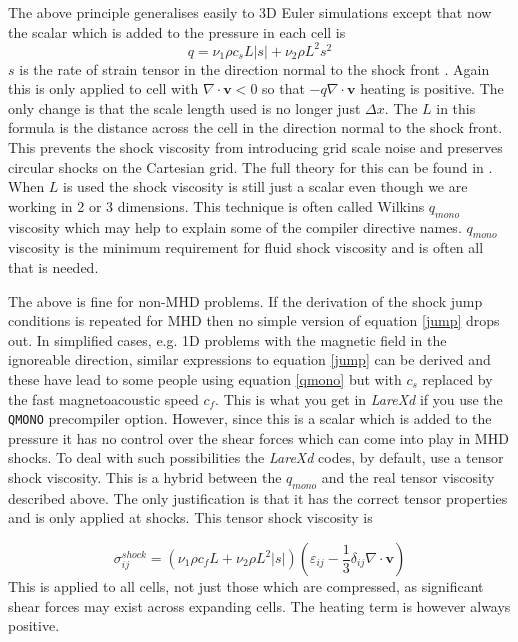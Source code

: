 \documentclass[11pt]{article}
\begin{document}
The above principle generalises easily to 3D Euler simulations except that now the scalar which is added to the pressure in each cell is
\begin{equation}
q = \nu_1 \rho c_s L|s| + \nu_2 \rho L^2 s^2 \label{qmono}
\end{equation}
$s$ is the rate of strain tensor in the direction normal to the shock front \cite{wilkins}. Again this is only applied to cell with $\nabla\cdot\mathbf{v}<0$ so that $-q \nabla\cdot\mathbf{v}$ heating is positive. The only change is that the scale length used is no longer just $\Delta x$. The $L$ in this formula is the distance across the cell in the direction normal to the shock front. This prevents the shock viscosity from introducing grid scale noise and preserves circular shocks on the Cartesian grid. The full theory for this can be found in \cite{wilkins}. When $L$ is used the shock viscosity is still just a scalar even though we are working in 2 or 3 dimensions. This technique is often called Wilkins $q_{mono}$ viscosity which may help to explain some of the compiler directive names. $q_{mono}$ viscosity is the minimum requirement for fluid shock viscosity and is often all that is needed.

The above is fine for non-MHD problems. If the derivation of the shock jump conditions is repeated for MHD then no simple version of equation \ref{jump} drops out. In simplified cases, e.g. 1D problems with the magnetic field in the ignoreable direction, similar expressions to equation \ref{jump} can be derived and these have lead to some people using  equation \ref{qmono} but with $c_s$ replaced by the fast magnetoacoustic speed $c_f$. This is what you get in {\it LareXd} if you use the \texttt{QMONO} precompiler option. However, since this is a scalar which is added to the pressure it has no control over the shear forces which can come into play in MHD shocks. To deal with such possibilities the {\it LareXd} codes, by default, use a tensor shock viscosity. This is a hybrid between the $q_{mono}$ and the real tensor viscosity described above. The only  justification is that it has the correct tensor properties and is only applied at shocks. This tensor shock viscosity is

\begin{equation}
\sigma_{ij}^{shock} =  (\nu_1 \rho c_f L + \nu_2 \rho L^2 |s|)  \left(\varepsilon_{ij}-\frac{1}{3}\delta_{ij}\nabla\cdot\mathbf{v}\right)   \label{shock}
\end{equation}
This is applied to all cells, not just those which are compressed, as significant shear forces may exist across expanding cells. The heating term is however always positive.   
\end{document}

